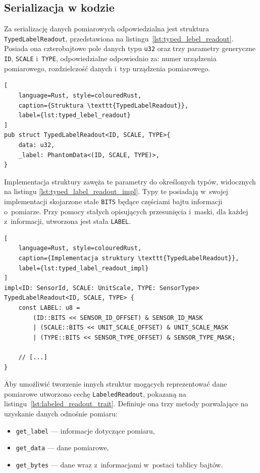\subsection*{Serializacja w kodzie}
Za serializację danych pomiarowych odpowiedzialna 
jest struktura \texttt{TypedLabelReadout}, przedstawiona na 
listingu~\ref{lst:typed_lebel_readout}.
Posiada ona czterobajtowe pole danych typu \texttt{u32} 
oraz trzy parametry generyczne \texttt{ID}, \texttt{SCALE}
i~\texttt{TYPE}, odpowiedzialne odpowiednio za: numer urządzenia
pomiarowego, rozdzielczość danych i~typ urządzenia pomiarowego.

\begin{lstlisting}[
    language=Rust, style=colouredRust, 
    caption={Struktura \texttt{TypedLabelReadout}},
    label={lst:typed_lebel_readout}
]
pub struct TypedLabelReadout<ID, SCALE, TYPE>{
    data: u32,
    _label: PhantomData<(ID, SCALE, TYPE)>,
}
\end{lstlisting}

Implementacja struktury zawęża te parametry do określonych typów,
widocznych na listingu \ref{lst:typed_label_readout_impl}.
Typy te posiadają w~swojej implementacji skojarzone stałe
\texttt{BITS} będące częściami bajtu informacji o~pomiarze.
Przy pomocy stałych opisujących przesunięcia i~maski, dla
każdej z~informacji, utworzona jest stała \texttt{LABEL}.

\begin{lstlisting}[
    language=Rust, style=colouredRust, 
    caption={Implementacja struktury \texttt{TypedLabelReadout}},
    label={lst:typed_label_readout_impl}
]
impl<ID: SensorId, SCALE: UnitScale, TYPE: SensorType> TypedLabelReadout<ID, SCALE, TYPE> {
    const LABEL: u8 = 
        (ID::BITS << SENSOR_ID_OFFSET) & SENSOR_ID_MASK
        | (SCALE::BITS << UNIT_SCALE_OFFSET) & UNIT_SCALE_MASK
        | (TYPE::BITS << SENSOR_TYPE_OFFSET) & SENSOR_TYPE_MASK;
    
    // [...]
}
\end{lstlisting}

Aby umożliwić tworzenie innych struktur mogących reprezentować
dane pomiarowe utworzono cechę \texttt{LabeledReadout},
pokazaną na listingu~\ref{lst:labeled_readout_trait}.
Definiuje ona trzy metody pozwalające na uzyskanie
danych odnośnie pomiaru:
\begin{itemize}
    \item \texttt{get\_label} --- informacje dotyczące pomiaru,
    \item \texttt{get\_data} --- dane pomiarowe,
    \item \texttt{get\_bytes} --- dane wraz z~informacjami 
    w~postaci tablicy bajtów.
\end{itemize}

